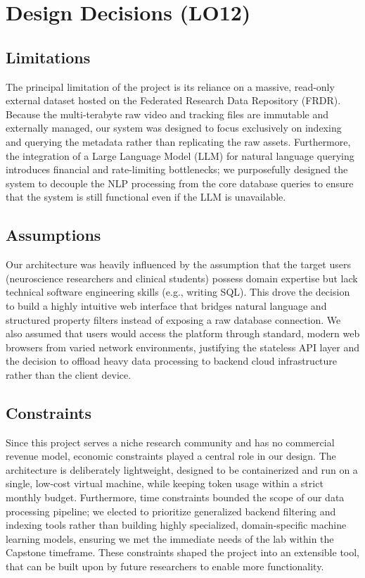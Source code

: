 \documentclass{article}
\begin{document}
\section{Design Decisions (LO12)}


\subsection{Limitations}

The principal limitation of the project is its reliance on a massive, read-only external dataset hosted on the Federated Research Data Repository (FRDR). Because the multi-terabyte raw video and tracking files are immutable and externally managed, our system was designed to focus exclusively on indexing and querying the metadata rather than replicating the raw assets. Furthermore, the integration of a Large Language Model (LLM) for natural language querying introduces financial and rate-limiting bottlenecks; we purposefully designed the system to decouple the NLP processing from the core database queries to ensure that the system is still functional even if the LLM is unavailable.

\subsection{Assumptions}

Our architecture was heavily influenced by the assumption that the target users (neuroscience researchers and clinical students) possess domain expertise but lack technical software engineering skills (e.g., writing SQL). This drove the decision to build a highly intuitive web interface that bridges natural language and structured property filters instead of exposing a raw database connection. We also assumed that users would access the platform through standard, modern web browsers from varied network environments, justifying the stateless API layer and the decision to offload heavy data processing to backend cloud infrastructure rather than the client device.

\subsection{Constraints}

Since this project serves a niche research community and has no commercial revenue model, economic constraints played a central role in our design. The architecture is deliberately lightweight, designed to be containerized and run on a single, low-cost virtual machine, while keeping token usage within a strict monthly budget. Furthermore, time constraints bounded the scope of our data processing pipeline; we elected to prioritize generalized backend filtering and indexing tools rather than building highly specialized, domain-specific machine learning models, ensuring we met the immediate needs of the lab within the Capstone timeframe. These constraints shaped the project into an extensible tool, that can be built upon by future researchers to enable more functionality. 
\end{document}
